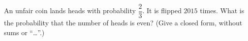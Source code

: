 An unfair coin lands heads with probability $\dfrac{2}{3}$. It is flipped $2015$ times. What is the probability that the number of heads is even? (Give a closed form, without sums or ``\dots''.)
